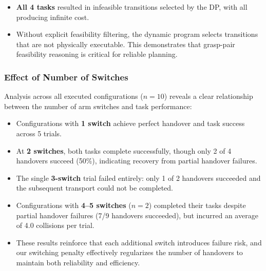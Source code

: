 \begin{itemize}
\item \textbf{All 4 tasks} resulted in infeasible transitions selected by the DP, with all producing infinite cost.
\item Without explicit feasibility filtering, the dynamic program selects transitions that are not physically executable. This demonstrates that grasp-pair feasibility reasoning is critical for reliable planning.
\end{itemize}

\subsubsection{Effect of Number of Switches}

Analysis across all executed configurations ($n=10$) reveals a clear relationship between the number of arm switches and task performance:
\begin{itemize}
\item Configurations with \textbf{1 switch} achieve perfect handover and task success across 5 trials.
\item At \textbf{2 switches}, both tasks complete successfully, though only 2 of 4 handovers succeed (50\%), indicating recovery from partial handover failures.
\item The single \textbf{3-switch} trial failed entirely: only 1 of 2 handovers succeeded and the subsequent transport could not be completed.
\item Configurations with \textbf{4--5 switches} ($n=2$) completed their tasks despite partial handover failures (7/9 handovers succeeded), but incurred an average of 4.0 collisions per trial.
\item These results reinforce that each additional switch introduces failure risk, and our switching penalty effectively regularizes the number of handovers to maintain both reliability and efficiency.
\end{itemize}
